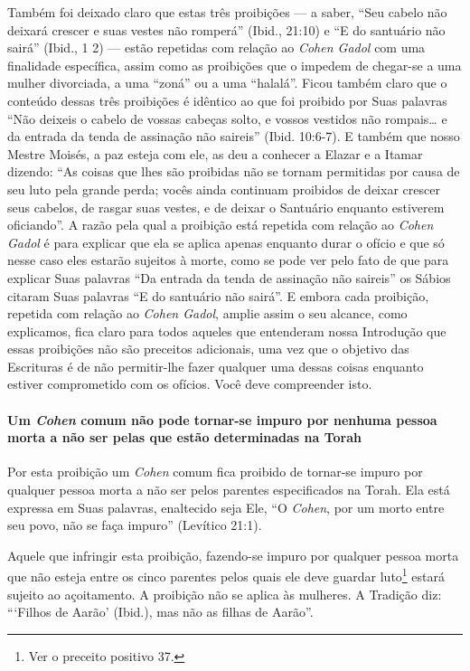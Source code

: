 Também foi deixado claro que estas três proibições --- a saber, ``Seu
cabelo não deixará crescer e suas vestes não romperá'' (Ibid., 21:10) e
``E do santuário não sairá'' (Ibid., 1 2) --- estão repetidas com
relação ao \textit{Cohen Gadol} com uma finalidade específica, assim como as
proibições que o impedem de chegar-se a uma mulher divorciada, a uma
``zoná'' ou a uma ``halalá''. Ficou também claro que o conteúdo dessas
três proibições é idêntico ao que foi proibido por Suas palavras ``Não
deixeis o cabelo de vossas cabeças solto, e vossos vestidos não
rompais\ldots{} e da entrada da tenda de assinação não saireis'' (Ibid.
10:6-7). E também que nosso Mestre Moisés, a paz esteja com ele, as deu
a conhecer a Elazar e a Itamar dizendo: ``As coisas que lhes são
proibidas não se tornam permitidas por causa de seu luto pela grande
perda; vocês ainda continuam proibidos de deixar crescer seus cabelos,
de rasgar suas vestes, e de deixar o Santuário enquanto estiverem
oficiando''. A razão pela qual a proibição está repetida com relação ao
\textit{Cohen Gadol} é para explicar que ela se aplica apenas enquanto durar
o ofício e que só nesse caso eles estarão sujeitos à morte, como se
pode ver pelo fato de que para explicar Suas palavras ``Da entrada da
tenda de assinação não saireis'' os Sábios citaram Suas palavras ``E do
santuário não sairá''. E embora cada proibição, repetida com relação ao
\textit{Cohen Gadol}, amplie assim o seu alcance, como explicamos, fica claro
para todos aqueles que entenderam nossa Introdução que essas proibições
não são preceitos adicionais, uma vez que o objetivo das Escrituras é
de não permitir-lhe fazer qualquer uma dessas coisas enquanto estiver
comprometido com os ofícios. Você deve compreender isto.

\paragraph{Um \textit{Cohen} comum não pode tornar-se impuro por nenhuma pessoa
morta a não ser pelas que estão determinadas na Torah}

Por esta proibição um \textit{Cohen} comum fica proibido de tornar-se impuro
por qualquer pessoa morta a não ser pelos parentes especificados na
Torah. Ela está expressa em Suas palavras, enaltecido seja Ele, ``O
\textit{Cohen}, por um morto entre seu povo, não se faça impuro'' (Levítico
21:1).

Aquele que infringir esta proibição, fazendo-se impuro por qualquer
pessoa morta que não esteja entre os cinco parentes pelos quais ele deve
guardar luto\footnote{Ver o preceito positivo 37.} estará sujeito ao açoitamento. A
proibição não se aplica às mulheres. A Tradição diz: ```Filhos de
Aarão' (Ibid.), mas não as filhas de Aarão''.


